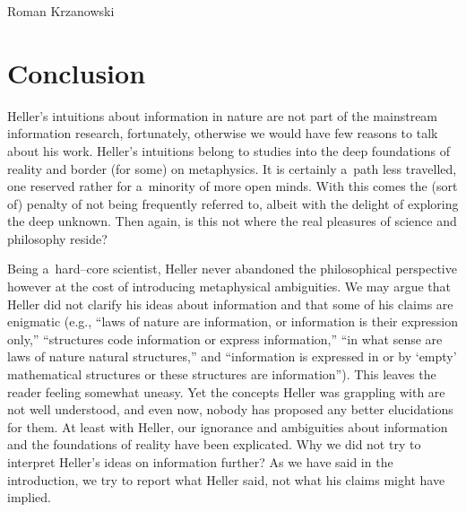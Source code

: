 \begin{artengenv}{Roman Krzanowski}
\section{Conclusion}

Heller's intuitions about information in nature are not part of the mainstream information research, fortunately, otherwise we would have few reasons to talk about his work. Heller's intuitions belong to studies into the deep foundations of reality and border (for some) on metaphysics. It is certainly a~path less travelled, one reserved rather for a~minority of more open minds. With this comes the (sort of) penalty of not being frequently referred to, albeit with the delight of exploring the deep unknown. Then again, is this not where the real pleasures of science and philosophy reside?



Being a~hard–core scientist, Heller never abandoned the philosophical perspective 
\parencites[called by himself ‘philosophy in science', see][]{heller_how_2019}[][]{polak_philosophy_2019}[][]{polak_beyond_2022} %
 however at the cost of introducing metaphysical ambiguities. We may argue that Heller did not clarify his ideas about information and that some of his claims are enigmatic (e.g., ``laws of nature are information, or information is their expression only,'' ``structures code information or express information,'' ``in what sense are laws of nature natural structures,'' and ``information is expressed in or by ‘empty' mathematical structures or these structures are information''). This leaves the reader feeling somewhat uneasy. Yet the concepts Heller was grappling with are not well understood, and even now, nobody has proposed any better elucidations for them. At least with Heller, our ignorance and ambiguities about information and the foundations of reality have been explicated. Why we did not try to interpret Heller's ideas on information further? As we have said in the introduction, we try to report what Heller said, not what his claims might have implied.




\end{artengenv}
